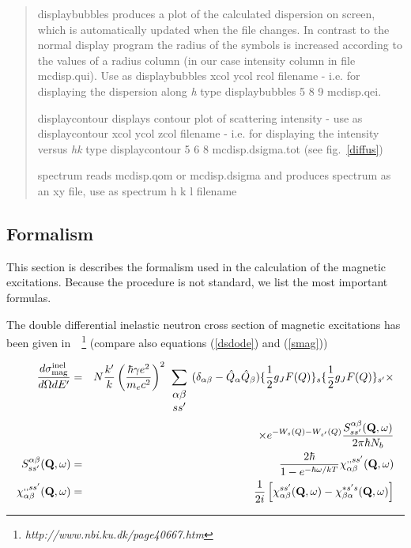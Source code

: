 \begin{quote}
\item [\prg displaybubbles\index{displaybubbles} ] produces a plot of the calculated dispersion on screen, which is 
                       automatically updated when the file changes. In contrast to the normal
		       display program the radius of the symbols is increased according to
		       the values of a radius column (in our case intensity column in file
		       mcdisp.qui). Use as {\prg displaybubbles 
		       xcol ycol rcol filename} - i.e. for displaying the dispersion along
		       {\em h} type {\prg displaybubbles  5 8 9 mcdisp.qei}. 
\item [\prg displaycontour\index{displaycontour}] displays contour plot of scattering intensity - use as
                       {\prg displaycontour xcol ycol zcol filename} - i.e. for displaying
		       the intensity versus {\em hk} type {\prg displaycontour 5 6 8 mcdisp.dsigma.tot}
		       (see fig.~\ref{diffus})
\item [\prg spectrum]  reads mcdisp.qom or mcdisp.dsigma and produces spectrum
                       as an xy file, use as {\prg spectrum h k l filename}
\end{quote}

\subsection{Formalism}
\label{formalism}

This section is describes the formalism used in the calculation of the magnetic excitations. Because the
procedure is not standard, we list the most important formulas.

The double differential
inelastic neutron cross section of magnetic excitations has been given in~\cite{jensen91-1}~\footnote{\em %
http://www.nbi.ku.dk/page40667.htm} (compare also equations (\ref{dsdode}) and (\ref{smag}))

\begin{eqnarray}\label{int}
\frac{d \sigma_{\rm mag}^{\rm inel}}{d\Omega dE'}&=&N \frac{k'}{k} \left(\frac{\hbar \gamma e^2}{m_e c^2}\right)^2
\sum_{\begin{array}{c} \alpha \beta \\ s s' \\ \end{array}}
(\delta_{\alpha\beta}-\hat Q_{\alpha} \hat Q_{\beta})
\{\frac{1}{2} g_J F(Q)\}_s \{\frac{1}{2} g_J F(Q)\}_{s'}
 \times \nonumber  \\
&&\times e^{-W_s(Q)- W_{s'}(Q)} 
\frac{S_{ss'}^{\alpha\beta}({\mathbf Q},\omega)}{2\pi \hbar N_b}  \nonumber \\
S_{ss'}^{\alpha\beta}({\mathbf Q},\omega) &=&
\frac{2 \hbar}{1-e^{-\hbar\omega/kT}} \chi_{\alpha\beta}^{,,ss'}({\mathbf Q},\omega) \\ \nonumber
\chi_{\alpha\beta}^{,,ss'}({\mathbf Q},\omega)&=&
\frac{1}{2i}\left[
\chi_{\alpha\beta}^{ss'}({\mathbf Q},\omega)-
\chi_{\beta\alpha}^{*s's}({\mathbf Q},\omega)
\right]
\end{eqnarray}

